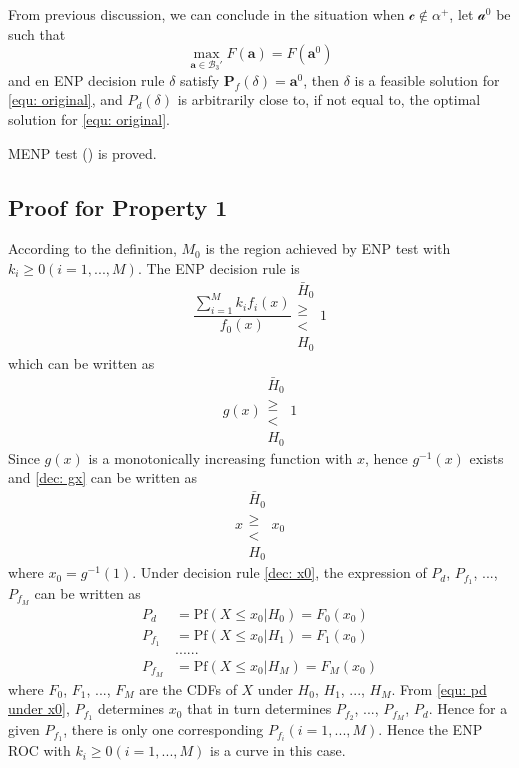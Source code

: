 \documentclass[12pt,journal,a4paper,twoside,onecolumn]{IEEEtran}
\newcommand{\rmnum}[1]{\romannumeral #1}
\begin{document}
\begin{spacing}{2.5}
From previous discussion, we can conclude in the situation when $\mathcal{c} \notin \alpha^+$, let $\mathcal{a}^0$ be such that 
\begin{equation}
\max_{\mathbf{a} \in \mathcal{B}_3'} F(\mathbf{a}) = F(\mathbf{a}^0)
\end{equation}
and en ENP decision rule $\delta$ satisfy $\mathbf{P}_f(\delta) = \mathbf{a}^0$, then $\delta$ is a feasible solution for \eqref{equ: original}, and $P_d(\delta)$ is arbitrarily close to, if not equal to, the optimal solution for \eqref{equ: original}.

MENP test (\rmnum{2}) is proved.

\subsection{Proof for Property 1}
According to the definition, $M_0$ is the region achieved by ENP test with $k_i \geq 0 (i=1, ..., M)$. The ENP decision rule is
\begin{equation}
\frac{\sum_{i=1}^{M}k_if_i(x)}{f_0(x)} \substack{\bar{H}_0 \\\geq\\< \\H_0}1
\end{equation}
which can be written as
\begin{equation}
\label{dec: gx}
g(x)\substack{\bar{H}_0 \\\geq\\< \\H_0}1
\end{equation}
Since $g(x)$ is a monotonically increasing function with $x$, hence $g^{-1}(x)$ exists and \eqref{dec: gx} can be written as 
\begin{equation}
\label{dec: x0}
x\substack{\bar{H}_0 \\\geq\\< \\H_0}x_0
\end{equation}
where $x_0 = g^{-1}(1)$.
Under decision rule \eqref{dec: x0}, the expression of $P_d$, $P_{f_1}$, ..., $P_{f_M}$ can be written as 
\begin{equation}
\begin{split}
\label{equ: pd under x0}
P_d &= \text{Pf}(X \leq x_0 | H_0) = F_0(x_0)\\
P_{f_1} &= \text{Pf}(X \leq x_0 | H_1) = F_1(x_0)\\
  &......\\
P_{f_M} &= \text{Pf}(X \leq x_0 | H_M) = F_M(x_0)
\end{split}
\end{equation}
where $F_0$, $F_1$, ..., $F_M$ are the CDFs of $X$ under $H_0$, $H_1$, ..., $H_M$. From \eqref{equ: pd under x0}, $P_{f_1}$ determines $x_0$ that in turn determines $P_{f_2}$, ..., $P_{f_M}$, $P_d$. Hence for a given $P_{f_1}$, there is only one corresponding $P_{f_i} (i= 1, ..., M)$. Hence the ENP ROC with $k_i \geq 0 (i = 1, ..., M)$ is a curve in this case.


\end{spacing}
\end{document}
